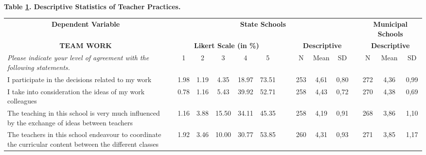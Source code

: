 \documentclass[a4paper, 12pt]{article}
\begin{document}
\tablename\ \addtocounter{table}{-1}
\begin{landscape}
\begin{table}[htbp]
  \centering
 \label{table:DependentTeacher} \centering \textbf{Table \ref{table:DependentTeacher}. Descriptive Statistics of Teacher Practices.} \\
  \begin{adjustbox}{width=10.5in,totalheight=6in}
    \begin{tabular}{llcccccccccccccc}   
    \toprule
    \multicolumn{1}{c}{\textbf{Dependent Variable}} &       & \multicolumn{10}{c}{\textbf{State Schools}}                                   &       & \multicolumn{3}{c}{\textbf{Municipal Schools}} \\
\cmidrule{1-1}\cmidrule{3-12}\cmidrule{14-16}    \multicolumn{1}{c}{\textbf{TEAM WORK}} &       & \multicolumn{5}{c}{\textbf{Likert Scale (in \%)}} &       &       & \multicolumn{3}{c}{\textbf{Descriptive}} &       & \multicolumn{3}{c}{\textbf{Descriptive}} \\
\cmidrule{1-1}\cmidrule{3-7}\cmidrule{10-12}\cmidrule{14-16}    \textit{Please indicate your level of agreement with the following statements.} &       & 1     & 2     & 3     & 4     & 5     &       &       & N     & Mean  & SD    &       & N     & Mean  & SD \\
\cmidrule{1-1}\cmidrule{3-7}\cmidrule{10-12}\cmidrule{14-16}    I participate in the decisions related to my work &       & 1.98  & 1.19  & 4.35  & 18.97 & 73.51 &       &       & 253   & 4,61  & 0,80  &       & 272   & 4,36  & 0,99 \\
    I take into consideration the ideas of my work colleagues &       & 0.78  & 1.16  & 5.43  & 39.92 & 52.71 &       &       & 258   & 4,43  & 0,72  &       & 270   & 4,38  & 0,69 \\
    The teaching in this school is very much influenced by the exchange of ideas between teachers &       & 1.16  & 3.88  & 15.50 & 34.11 & 45.35 &       &       & 258   & 4,19  & 0,91  &       & 268   & 3,86  & 1,10 \\
    The teachers in this school endeavour to coordinate the curricular content between the different classes &       & 1.92  & 3.46  & 10.00 & 30.77 & 53.85 &       &       & 260   & 4,31  & 0,93  &       & 271   & 3,85  & 1,17 \\

\end{tabular}
\end{adjustbox}
\end{table}
\end{landscape}
\end{document}
